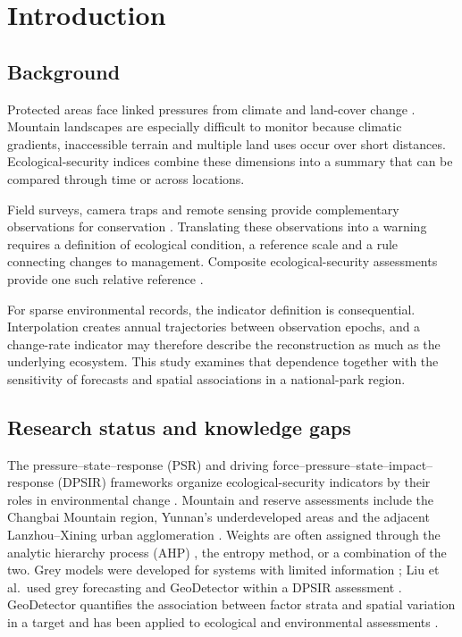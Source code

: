 \documentclass[preprint,11pt,authoryear]{elsarticle}
\begin{document}
\section{Introduction}
\label{sec:intro}

\subsection{Background}
Protected areas face linked pressures from climate and land-cover change \citep{wwf2020living,ipcc2014climate}. Mountain landscapes are especially difficult to monitor because climatic gradients, inaccessible terrain and multiple land uses occur over short distances. Ecological-security indices combine these dimensions into a summary that can be compared through time or across locations.

Field surveys, camera traps and remote sensing provide complementary observations for conservation \citep{kerry2022remote,bijl2022camera}. Translating these observations into a warning requires a definition of ecological condition, a reference scale and a rule connecting changes to management. Composite ecological-security assessments provide one such relative reference \citep{liu2023integrated,jinan_land_esp_2022}.

For sparse environmental records, the indicator definition is consequential. Interpolation creates annual trajectories between observation epochs, and a change-rate indicator may therefore describe the reconstruction as much as the underlying ecosystem. This study examines that dependence together with the sensitivity of forecasts and spatial associations in a national-park region.

\subsection{Research status and knowledge gaps}
The pressure--state--response (PSR) and driving force--pressure--state--impact--response (DPSIR) frameworks organize ecological-security indicators by their roles in environmental change \citep{changbai_dpsirm_2024,dpsir_dea_threegorges2023}. Mountain and reserve assessments include the Changbai Mountain region, Yunnan's underdeveloped areas and the adjacent Lanzhou--Xining urban agglomeration \citep{lu2014changbai,ou2017yunnan,tong2020lanzhou}. Weights are often assigned through the analytic hierarchy process (AHP) \citep{saaty1980analytic}, the entropy method, or a combination of the two. Grey models were developed for systems with limited information \citep{deng1982control}; Liu et al.\ used grey forecasting and GeoDetector within a DPSIR assessment \citep{liu2023integrated}. GeoDetector quantifies the association between factor strata and spatial variation in a target \citep{wang2016measure,wang2012environmental} and has been applied to ecological and environmental assessments \citep{westliaohe_esp_2026,china_ecoenv_2024,qilian_ez_2024,zhang2019geodetector}.
\end{document}
